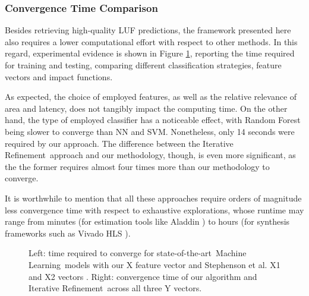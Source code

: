\documentclass[]{usiinfthesis}
\newcommand{\SoTA}{{state-of-the-art}}
\newcommand{\ML}{{Machine Learning}}
\newcommand{\ItRef}{{Iterative Refinement}}
\begin{document}
\subsubsection{Convergence Time Comparison}


Besides retrieving high-quality LUF predictions, the framework presented here also requires
a lower computational effort with respect to other methods.
In this regard, experimental evidence is shown in Figure \ref{fig:time},
reporting the time required for training and testing, comparing
different classification strategies, feature vectors and impact functions.\par

As expected, the choice of employed features, as well as the relative relevance of
area and latency, does not tangibly impact the computing time. On the other hand,
the type of employed classifier has a noticeable effect, with Random Forest
being slower to converge than NN and SVM. Nonetheless, only 14 seconds were
required by our approach. The difference between the \ItRef\ 
approach and our methodology, though, is even
more significant, as the the former requires almost four times more than our 
methodology to converge.\par

It is worthwhile to mention that all these approaches 
 require orders of magnitude less convergence time with respect to exhaustive explorations, 
 whose runtime may range from minutes (for estimation tools like Aladdin \cite{ShaoJul14})
 to hours (for synthesis frameworks such as Vivado HLS \cite{VivadoHLSMar17}).


%
%
\begin{figure}[t]
\centering
{}
\vspace{-1em}
\caption{Left: time required to converge for \SoTA\ \ML\ models with  
our X feature vector and
Stephenson et al. X1 and X2 vectors \cite{StephensonApr05}. Right: convergence time
of our algorithm
and \ItRef\ across all three Y vectors. 
}
\vspace{-1em}
\label{fig:time}
\end{figure}
\end{document}
